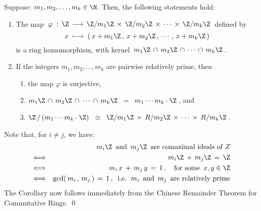 \begin{corollary}
\mbox{}
\vskip 0.2cm
\noindent
Suppose: $m_{1}, m_{2}, \ldots , m_{k} \in \N$.
Then, the following statements hold:
\begin{enumerate}
\item
	The map
	\,$\varphi \;:\, \Z \,\longrightarrow\, \Z/m_{1}\Z \,\times\, \Z/m_{2}\Z \,\times\, \cdots \,\times\, \Z/m_{k}\Z$\,
	defined by
	\begin{equation*}
	x \; \longmapsto \; \left(\, x+m_{1}\Z \,,\, x+m_{2}\Z \,,\, \cdots \,,\, x+m_{k}\Z\,\right)
	\end{equation*}
	is a ring homomorphism, with kernel \,$m_{1}\Z \,\cap\, m_{2}\Z \,\cap\, \cdots \,\cap \,m_{k}\Z$\,.
\item
	If the integers $m_{1}, m_{2}, \ldots, m_{k}$ are pairwise relatively prime, then
	\begin{enumerate}
	\item
		the map $\varphi$ is surjective,
	\item
		$m_{1}\Z \,\cap\, m_{2}\Z \,\cap\, \cdots \,\cap \,m_{k}\Z \;\; = \;\; m_{1} \cdots m_{k} \cdot \Z$\,, and
	\item
		$\Z \,/\, (m_{1} \cdots m_{k} \cdot \Z)$
		\,$\cong$\,
			$\Z/m_{1}\Z \,\times\, R/m_{2}\Z \,\times\, \cdots \,\times\, R/m_{k}\Z$\,.
	\end{enumerate}
\end{enumerate}
\end{corollary}
\proof
Note that, for $i \neq j$, we have:
\begin{eqnarray*}
&&
	\textnormal{$m_{i}\Z$\, and \,$m_{j}\Z$\, are comaximal ideals of $Z$}
\\
& \Longleftrightarrow &
	m_{i}\Z \, + \, m_{j}\Z \,=\, \Z
\\
& \Longleftrightarrow &
	m_{i}\,x \, + \, m_{j}\,y \,=\, 1\,,
	\quad
	\textnormal{for some \,$x, y \in \Z$}
\\
& \Longleftrightarrow &
	\gcd(\,m_{i}\,,\,m_{j}\,) \,=\, 1\,,
	\;\;\textnormal{i.e. \,$m_{i}$\, and \,$m_{j}$\, are relatively prime}
\end{eqnarray*}
The Corollary now follows immediately from
the Chinese Remainder Theorem for Commutative Rings.
\qed

